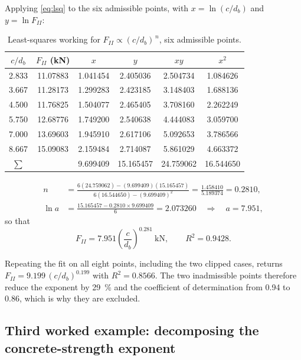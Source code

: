 Applying \eqref{eq:lsq} to the six admissible points, with
$x = \ln(c/d_b)$ and $y = \ln F_{II}$:

\begin{table}[H]
\centering
\caption{Least-squares working for $F_{II} \propto (c/d_b)^{\,n}$, six
         admissible points.}
\label{tab:lsqcov}
\small
\begin{tabular*}{\linewidth}{@{\extracolsep{\fill}}cccccc@{}}
\hline
$c/d_b$ & $F_{II}$ (kN) & $x$ & $y$ & $xy$ & $x^2$ \\
\hline
2.833 & 11.07883 & 1.041454 & 2.405036 & 2.504734 & 1.084626 \\
3.667 & 11.28173 & 1.299283 & 2.423185 & 3.148403 & 1.688136 \\
4.500 & 11.76825 & 1.504077 & 2.465405 & 3.708160 & 2.262249 \\
5.750 & 12.68776 & 1.749200 & 2.540638 & 4.444083 & 3.059700 \\
7.000 & 13.69603 & 1.945910 & 2.617106 & 5.092653 & 3.786566 \\
8.667 & 15.09083 & 2.159484 & 2.714087 & 5.861029 & 4.663372 \\
\hline
$\sum$ & & 9.699409 & 15.165457 & 24.759062 & 16.544650 \\
\hline
\end{tabular*}
\end{table}

\begin{align}
n &= \frac{6(24.759062) - (9.699409)(15.165457)}
          {6(16.544650) - (9.699409)^2}
   = \frac{1.458410}{5.189374} = 0.2810 , \\[4pt]
\ln a &= \frac{15.165457 - 0.2810 \times 9.699409}{6} = 2.073260
      \quad\Longrightarrow\quad a = 7.951 ,
\end{align}
so that
\begin{equation}
\label{eq:covfitapp}
F_{II} = 7.951 \left(\frac{c}{d_b}\right)^{0.281}\ \si{\kilo\newton},
\qquad R^2 = 0.9428 .
\end{equation}

Repeating the fit on all eight points, including the two clipped cases,
returns $F_{II} = 9.199\,(c/d_b)^{0.199}$ with $R^2 = 0.8566$. The two
inadmissible points therefore reduce the exponent by \SI{29}{\percent} and
the coefficient of determination from \num{0.94} to \num{0.86}, which is
why they are excluded.

\subsection*{Third worked example: decomposing the concrete-strength
             exponent}

